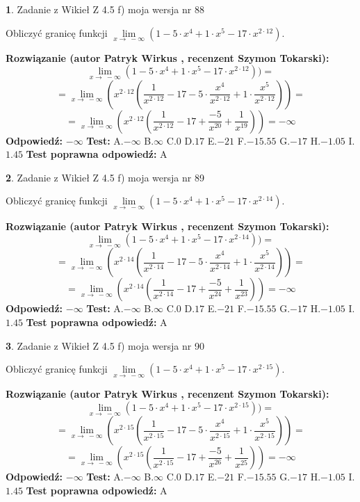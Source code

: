 \documentclass[12pt, a4paper]{article}
\theoremstyle{definition} %
\newtheorem{zad}{}
\newcommand{\zadStart}[1]{\begin{zad}#1\newline}
\newcommand{\zadStop}{\end{zad}}
\newcommand{\rozwStart}[2]{\noindent \textbf{Rozwiązanie (autor #1 , recenzent #2): }\newline}
\newcommand{\rozwStop}{\newline}
\newcommand{\odpStart}{\noindent \textbf{Odpowiedź:}\newline}
\newcommand{\odpStop}{\newline}
\newcommand{\testStart}{\noindent \textbf{Test:}\newline}
\newcommand{\testStop}{\newline}
\newcommand{\kluczStart}{\noindent \textbf{Test poprawna odpowiedź:}\newline}
\newcommand{\kluczStop}{\newline}
\begin{document}
\zadStart{Zadanie z Wikieł Z 4.5 f) moja wersja nr 88}


Obliczyć granicę funkcji  $\lim\limits_{x\to\ -\infty}(1 - 5 \cdot x^{4}+1 \cdot x^{5}- 17 \cdot x^{2\cdot12})$.
\zadStop
\rozwStart{Patryk Wirkus}{Szymon Tokarski}
$$\lim\limits_{x\to\ -\infty}(1 - 5 \cdot x^{4}+1 \cdot x^{5}- 17 \cdot x^{2\cdot12}))=$$
$$=\lim\limits_{x\to\ -\infty}(x^{2\cdot12}(\frac{1}{x^{2\cdot12}}-17 -5 \cdot \frac{x^{4}}{x^{2\cdot12}}+1 \cdot \frac{x^{5}}{x^{2\cdot12}}))=$$
$$=\lim\limits_{x\to\ -\infty}(x^{2\cdot12}(\frac{1}{x^{2\cdot12}}-17 + \frac{-5}{x^{20}}+ \frac{1}{x^{19}}))=-\infty$$
\rozwStop
\odpStart
$-\infty$
\odpStop
\testStart
A.$-\infty$ B.$\infty$ C.$0$ D.$17$ E.$-21$
F.$-15.55$ G.$-17$
H.$-1.05$
I.$1.45$
\testStop
\kluczStart
A
\kluczStop



\zadStart{Zadanie z Wikieł Z 4.5 f) moja wersja nr 89}


Obliczyć granicę funkcji  $\lim\limits_{x\to\ -\infty}(1 - 5 \cdot x^{4}+1 \cdot x^{5}- 17 \cdot x^{2\cdot14})$.
\zadStop
\rozwStart{Patryk Wirkus}{Szymon Tokarski}
$$\lim\limits_{x\to\ -\infty}(1 - 5 \cdot x^{4}+1 \cdot x^{5}- 17 \cdot x^{2\cdot14}))=$$
$$=\lim\limits_{x\to\ -\infty}(x^{2\cdot14}(\frac{1}{x^{2\cdot14}}-17 -5 \cdot \frac{x^{4}}{x^{2\cdot14}}+1 \cdot \frac{x^{5}}{x^{2\cdot14}}))=$$
$$=\lim\limits_{x\to\ -\infty}(x^{2\cdot14}(\frac{1}{x^{2\cdot14}}-17 + \frac{-5}{x^{24}}+ \frac{1}{x^{23}}))=-\infty$$
\rozwStop
\odpStart
$-\infty$
\odpStop
\testStart
A.$-\infty$ B.$\infty$ C.$0$ D.$17$ E.$-21$
F.$-15.55$ G.$-17$
H.$-1.05$
I.$1.45$
\testStop
\kluczStart
A
\kluczStop



\zadStart{Zadanie z Wikieł Z 4.5 f) moja wersja nr 90}


Obliczyć granicę funkcji  $\lim\limits_{x\to\ -\infty}(1 - 5 \cdot x^{4}+1 \cdot x^{5}- 17 \cdot x^{2\cdot15})$.
\zadStop
\rozwStart{Patryk Wirkus}{Szymon Tokarski}
$$\lim\limits_{x\to\ -\infty}(1 - 5 \cdot x^{4}+1 \cdot x^{5}- 17 \cdot x^{2\cdot15}))=$$
$$=\lim\limits_{x\to\ -\infty}(x^{2\cdot15}(\frac{1}{x^{2\cdot15}}-17 -5 \cdot \frac{x^{4}}{x^{2\cdot15}}+1 \cdot \frac{x^{5}}{x^{2\cdot15}}))=$$
$$=\lim\limits_{x\to\ -\infty}(x^{2\cdot15}(\frac{1}{x^{2\cdot15}}-17 + \frac{-5}{x^{26}}+ \frac{1}{x^{25}}))=-\infty$$
\rozwStop
\odpStart
$-\infty$
\odpStop
\testStart
A.$-\infty$ B.$\infty$ C.$0$ D.$17$ E.$-21$
F.$-15.55$ G.$-17$
H.$-1.05$
I.$1.45$
\testStop
\kluczStart
A
\kluczStop
\end{document}
